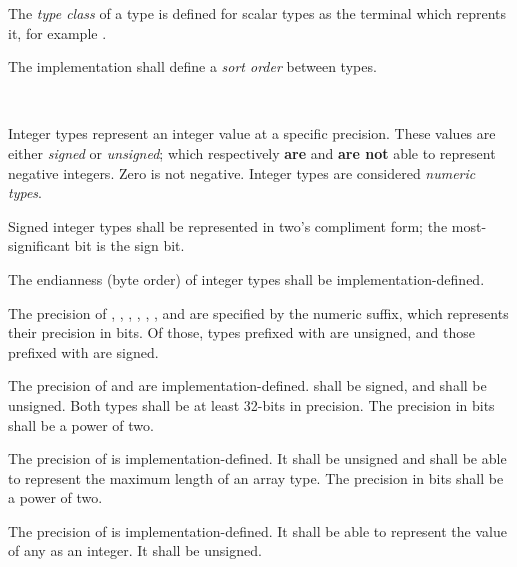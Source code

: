 \specsubitem
The \textit{type class} of a type is defined for scalar types as the terminal
which reprents it, for example .

\specsubitem
The implementation shall define a \textit{sort order} between types.


\begin{grammar}
\oneof \\
\end{grammar}

\specsubsubitem
Integer types represent an integer value at a specific precision. These values
are either \textit{signed} or \textit{unsigned}; which respectively
\textbf{are} and \textbf{are not} able to represent negative integers. Zero is
not negative. Integer types are considered \textit{numeric types}.

\specsubsubitem
Signed integer types shall be represented in two's compliment form; the
most-significant bit is the sign bit.

\specsubsubitem
The endianness (byte order) of integer types shall be implementation-defined.

\specsubsubitem
The precision of , , ,
, , , and 
are specified by the numeric suffix, which represents their precision in bits.
Of those, types prefixed with  are unsigned, and those prefixed
with  are signed.

\specsubsubitem
The precision of  and  are
implementation-defined.  shall be signed, and
 shall be unsigned. Both types shall be at least 32-bits in
precision. The precision in bits shall be a power of two.

\specsubsubitem
The precision of  is implementation-defined. It shall be
unsigned and shall be able to represent the maximum length of an array type.
The precision in bits shall be a power of two.

\specsubsubitem
The precision of  is implementation-defined. It shall be
able to represent the value of any  as an integer.
It shall be unsigned.

